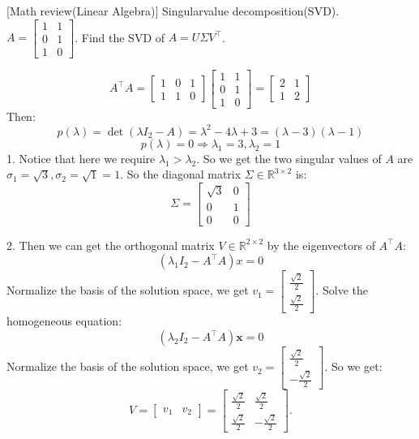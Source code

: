 \item {} [Math review(Linear Algebra)] Singularvalue decomposition(SVD). \\
$A=\left[\begin{array}{ll}1 & 1 \\ 0 & 1 \\ 1 & 0\end{array}\right]$. Find the SVD of $A=U \Sigma V^{\top}$.

\solution
$$A^{\top} A=\left[\begin{array}{lll}1 & 0 & 1 \\ 1 & 1 & 0\end{array}\right]\left[\begin{array}{ll}1 & 1 \\ 0 & 1 \\ 1 & 0\end{array}\right]=\left[\begin{array}{ll}2 & 1 \\ 1 & 2\end{array}\right]$$
Then:
$$p(\lambda)=\operatorname{det}\left(\lambda I_2-A\right)=\lambda^2-4 \lambda+3=(\lambda-3)(\lambda-1)$$
$$p(\lambda)=0\Rightarrow\lambda_1=3, \lambda_2=1$$
1. Notice that here we require $\lambda_1>\lambda_2$. So we get the two singular values of $A$ are $\sigma_1=\sqrt{3}, \sigma_2=\sqrt{1}=1$. So the diagonal matrix $\Sigma \in \mathbb{R}^{3 \times 2}$ is:
$$\Sigma=\left[\begin{array}{cc}
\sqrt{3} & 0 \\
0 & 1 \\
0 & 0
\end{array}\right]$$

2. Then we can get the orthogonal matrix $V\in\mathbb{R}^{2\times 2}$ by the eigenvectors of $A^{\top} A$:
$$\left(\lambda_1 I_2-A^{\top} A\right) x=0$$
Normalize the basis of the solution space, we get $v_1=\left[\begin{array}{c}\frac{\sqrt{2}}{2} \\ \frac{\sqrt{2}}{2}\end{array}\right]$. Solve the homogeneous equation:
$$\left(\lambda_2 I_2-A^{\top} A\right) \boldsymbol{x}=0$$
Normalize the basis of the solution space, we get $v_2=\left[\begin{array}{c}\frac{\sqrt{2}}{2} \\ -\frac{\sqrt{2}}{2}\end{array}\right]$. So we get:
$$
V=\left[\begin{array}{ll}
v_1 & v_2
\end{array}\right]=\left[\begin{array}{cc}
\frac{\sqrt{2}}{2} & \frac{\sqrt{2}}{2} \\
\frac{\sqrt{2}}{2} & -\frac{\sqrt{2}}{2}
\end{array}\right] .
$$

